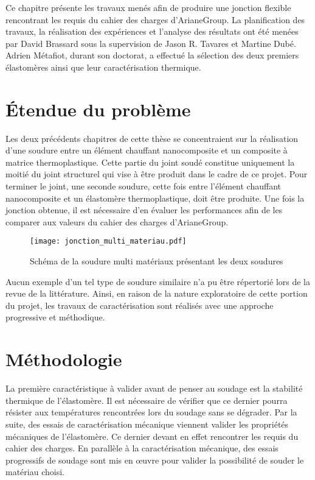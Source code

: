 \label{sec:Theme3}

Ce chapitre présente les travaux menés afin de produire une jonction flexible rencontrant les requis du cahier des charges d'ArianeGroup. 
La planification des travaux, la réalisation des expériences et l'analyse des résultats ont été menées par David Brassard sous la supervision de Jason R. Tavares et Martine Dubé. 
Adrien Métafiot, durant son doctorat, a effectué la sélection des deux premiers élastomères ainsi que leur caractérisation thermique. 

\section{Étendue du problème}

Les deux précédents chapitres de cette thèse se concentraient sur la réalisation d'une soudure entre un élément chauffant nanocomposite et un composite à matrice thermoplastique. 
Cette partie du joint soudé constitue uniquement la moitié du joint structurel qui vise à être produit dans le cadre de ce projet. 
Pour terminer le joint, une seconde soudure, cette fois entre l'élément chauffant nanocomposite et un élastomère thermoplastique, doit être produite. 
Une fois la jonction obtenue, il est nécessaire d'en évaluer les performances afin de les comparer aux valeurs du cahier des charges d'ArianeGroup. 

\begin{figure}[h]
	\centering
	\texttt{[image: jonction\_multi\_materiau.pdf]}
	\caption{Schéma de la soudure multi matériaux présentant les deux soudures}
	\label{fig:scema_double_jonction}
\end{figure}

Aucun exemple d'un tel type de soudure similaire n'a pu être répertorié lors de la revue de la littérature. 
Ainsi, en raison de la nature exploratoire de cette portion du projet, les travaux de caractérisation sont réalisés avec une approche progressive et méthodique. 

\section{Méthodologie}

La première caractéristique à valider avant de penser au soudage est la stabilité thermique de l'élastomère. 
Il est nécessaire de vérifier que ce dernier pourra résister aux températures rencontrées lors du soudage sans se dégrader. 
Par la suite, des essais de caractérisation mécanique viennent valider les propriétés mécaniques de l'élastomère.
Ce dernier devant en effet rencontrer les requis du cahier des charges. 
En parallèle à la caractérisation mécanique, des essais progressifs de soudage sont mis en œuvre pour valider la possibilité de souder le matériau choisi. 


